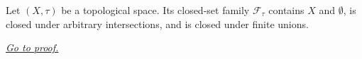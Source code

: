 \begin{theorem}
\label{thm:closed-sets-in-topological-space}
Let \((X,\tau)\) be a topological space.  Its closed-set family
\(\mathcal{F}_{\tau}\) contains \(X\) and \(\emptyset\), is closed under
arbitrary intersections, and is closed under finite unions.

\smallskip
\noindent
\hyperref[prf:closed-sets-in-topological-space]{\textit{Go to proof.}}
\end{theorem}